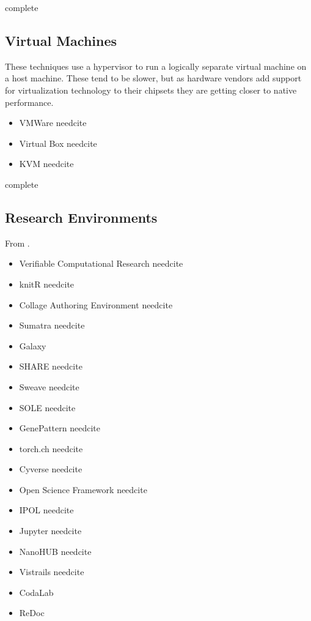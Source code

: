 \documentclass[american]{article}
\newcommand{\complete}{
	\gls{complete}
}
\newcommand{\needcite}{
	\gls{needcite}
}
\begin{document}
\complete

\subsection{Virtual Machines} \label{sec:software-virtual}

These techniques use a hypervisor to run a logically separate virtual machine on a host machine. These tend to be slower, but as hardware vendors add support for virtualization technology to their chipsets they are getting closer to native performance.

\begin{itemize}
\item VMWare \needcite
\item Virtual Box \needcite
\item KVM \needcite
\end{itemize}

\complete

\subsection{Research Environments} \label{sec:software-environments}

From \cite{stodden-sharing-reproducibility-talk-2017}.

\begin{itemize}
\item Verifiable Computational Research \needcite
\item knitR \needcite
\item Collage Authoring Environment \needcite
\item Sumatra \needcite
\item Galaxy \cite{afgan-galaxy-2016}
\item SHARE \needcite
\item Sweave \needcite
\item SOLE \needcite
\item GenePattern \needcite
\item torch.ch \needcite
\item Cyverse \needcite
\item Open Science Framework \needcite
\item IPOL \needcite
\item Jupyter \needcite
\item NanoHUB \needcite
\item Vistrails \needcite
\item CodaLab \cite{codalab}
\item ReDoc \cite{claerbout-make-reproducible-2000}
\end{itemize}
\end{document}

